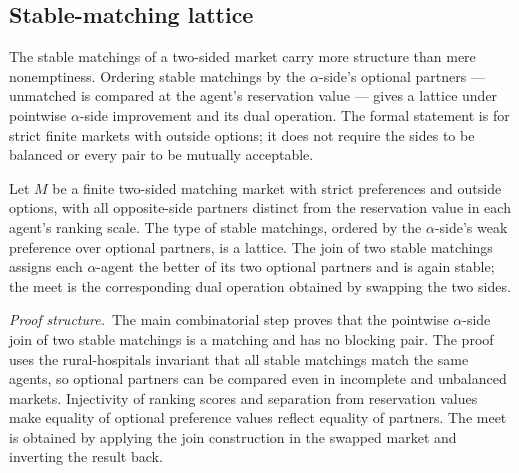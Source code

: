 
\subsection{Stable-matching lattice}
\label{sec:theorems:stable-lattice}

The stable matchings of a two-sided market carry more structure than
mere nonemptiness.  Ordering stable matchings by the $\alpha$-side's
optional partners — unmatched is compared at the agent's reservation
value — gives a lattice under pointwise $\alpha$-side improvement and
its dual operation.  The formal statement is for strict finite
markets with outside options; it does not require the sides to be
balanced or every pair to be mutually acceptable.

\begin{theorem}
\label{thm:stable-matching-lattice}
Let $M$ be a finite two-sided matching market with strict preferences
and outside options, with all opposite-side partners distinct from the
reservation value in each agent's ranking scale.  The type
 of stable matchings, ordered by the
$\alpha$-side's weak preference over optional partners, is a lattice.
The join of two stable matchings assigns each $\alpha$-agent the
better of its two optional partners and is again stable; the meet is
the corresponding dual operation obtained by swapping the two sides.
\end{theorem}

\noindent\emph{Proof structure.}\ The main combinatorial step proves
that the pointwise $\alpha$-side join of two stable matchings is a
matching and has no blocking pair.  The proof uses the rural-hospitals
invariant that all stable matchings match the same agents, so optional
partners can be compared even in incomplete and unbalanced markets.
Injectivity of ranking scores and separation from reservation values
make equality of optional preference values reflect equality of
partners.  The meet is obtained by applying the join construction in
the swapped market and inverting the result back.

